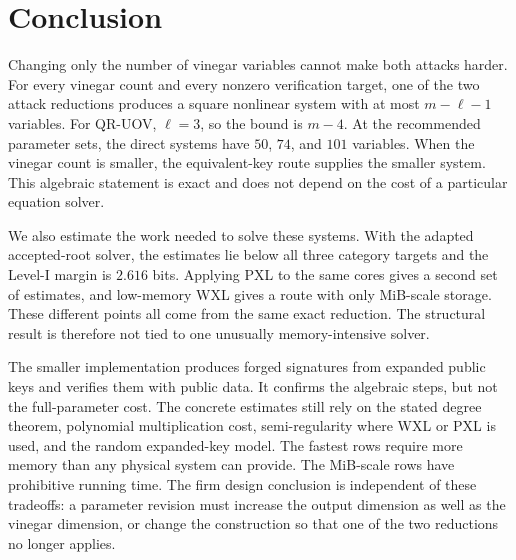 \documentclass[11pt,a4paper]{article}
\theoremstyle{definition}
\theoremstyle{remark}
\newcommand{\QRUOV}{\textsf{QR-UOV}}
\begin{document}
\section{Conclusion}\label{sec:conclusion}
Changing only the number of vinegar variables cannot make both attacks harder.
For every vinegar count and every nonzero verification target, one of the two
attack reductions produces a square nonlinear system with at most
$m-\ell-1$ variables.  For \QRUOV{}, $\ell=3$, so the bound is $m-4$.  At the
recommended parameter sets, the direct systems have $50$, $74$, and $101$
variables.  When the vinegar count is smaller, the equivalent-key route
supplies the smaller system.  This algebraic statement is exact and does not
depend on the cost of a particular equation solver.

We also estimate the work needed to solve these systems.  With the adapted
accepted-root solver, the estimates lie below all three category targets and
the Level-I margin is $2.616$ bits.  Applying PXL to the same cores gives a
second set of estimates, and low-memory WXL gives a route with only MiB-scale
storage.  These different points all come from the same exact reduction.  The
structural result is therefore not tied to one unusually memory-intensive
solver.

The smaller implementation produces forged signatures from expanded public
keys and verifies them with public data.  It confirms the algebraic steps, but
not the full-parameter cost.  The concrete estimates still rely on the stated
degree theorem, polynomial multiplication cost, semi-regularity where WXL or
PXL is used, and the random expanded-key model.  The fastest rows require more
memory than any physical system can provide.  The MiB-scale rows have
prohibitive running time.  The firm design conclusion is independent of these
tradeoffs: a parameter revision must increase the output dimension as well as
the vinegar dimension, or change the construction so that one of the two
reductions no longer applies.
\end{document}
